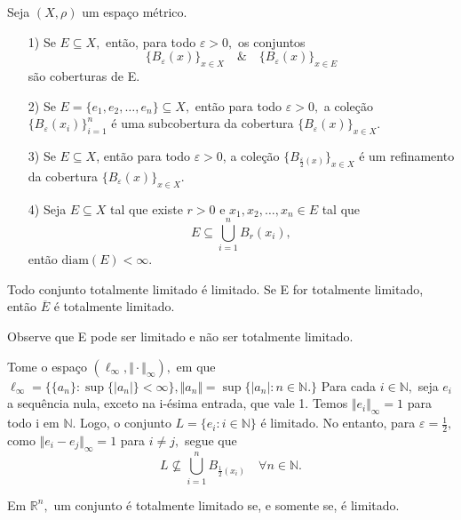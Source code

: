 \documentclass[metric_notes.tex]{subfiles}
\begin{document}
\begin{example}
	Seja \((X, \rho )\) um espaço métrico.
	\begin{itemize}
		\item[1)] Se \(E\subseteq{X},\) então, para todo \(\varepsilon >0,\) os conjuntos
		      \[
			      \{B_{\varepsilon }(x)\}_{x\in X}\quad\&\quad \{B_{\varepsilon }(x)\}_{x\in E}
		      \]
		      são coberturas de E.
		\item[2)] Se \(E = \{e_{1}, e_{2}, \dotsc, e_{n}\}\subseteq{X},\) então para todo \(\varepsilon >0,\) a coleção \(\{B_{\varepsilon }(x_{i})\}_{i=1}^{n}\) é uma subcobertura
		      da cobertura \(\{B_{\varepsilon }(x)\}_{x\in X}\).
		\item[3)] Se \(E\subseteq{X}\), então para todo \(\varepsilon >0\), a coleção \(\{B_{\frac{\varepsilon }{2}(x)}\}_{x\in X}\) é um refinamento da cobertura \(\{B_{\varepsilon }(x)\}_{x\in X}\).
		\item[4)] Seja \(E\subseteq{X}\) tal que existe \(r > 0\) e \(x_{1}, x_{2}, \dotsc, x_{n}\in E\) tal que
		      \[
			      E\subseteq{\bigcup_{i=1}^{n}{B_{r}(x_{i})}},
		      \]
		      então \(\mathrm{diam}(E) < \infty.\)
	\end{itemize}
\end{example}
\begin{prop*}
	Todo conjunto totalmente limitado é limitado. Se E for totalmente limitado, então \(\overline{E}\) é totalmente limitado.
\end{prop*}
Observe que E pode ser limitado e não ser totalmente limitado.
\begin{example}
	Tome o espaço \((\ell_{\infty}, \Vert \cdot  \Vert_{\infty}),\) em que \(\ell_{\infty}=\{\{a_{n}\}: \sup\{|a_{n}|\} < \infty\}, \Vert a_{n} \Vert = \sup\{|a_{n}|:n\in \mathbb{N}.\}\)
	Para cada \(i\in \mathbb{N},\) seja \(e_{i}\) a sequência nula, exceto na i-ésima entrada, que vale 1. Temos \(\Vert e_{i} \Vert_{\infty} = 1\) para todo i em \(\mathbb{N}.\) Logo,
	o conjunto \(L = \{e_{i}:i\in \mathbb{N}\}\) é limitado. No entanto, para \(\varepsilon = \frac{1}{2},\) como \(\Vert e_{i}-e_{j} \Vert_{\infty} = 1\) para \(i\neq j,\)
	segue que
	\[
		L\not\subseteq{\bigcup_{i=1}^{n}{B_{\frac{1}{2}(x_{i})}}}\quad \forall n\in \mathbb{N}.
	\]
\end{example}
\begin{example}[Exercício]
	Em \(\mathbb{R}^{n},\) um conjunto é totalmente limitado se, e somente se, é limitado.
\end{example}
\end{document}
